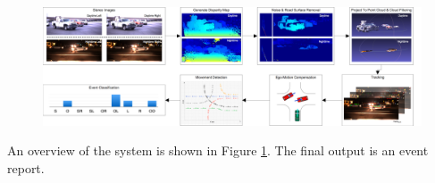 \vspace*{-2.5mm}
\begin{figure}[H]
  \centering
  \includegraphics[width=1\textwidth]{text/figures/methods/flowChart.png}
  \label{systemOverview::systemOverview}
\end{figure}
\begin{multicols}{2}   

An overview of the system is shown in Figure \ref{systemOverview::systemOverview}. The final output is an event report.

\end{multicols}



